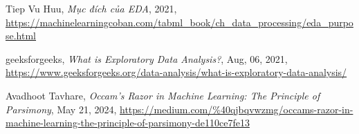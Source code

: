 \begin{thebibliography}{9}

	Tiep Vu Huu,
	\textit{Mục đích của EDA}, 2021,
	\newline
	\url{https://machinelearningcoban.com/tabml_book/ch_data_processing/eda_purpose.html}

	geeksforgeeks,
	\textit{What is Exploratory Data Analysis?}, Aug, 06, 2021,
	\newline
	\url{https://www.geeksforgeeks.org/data-analysis/what-is-exploratory-data-analysis/}

	Avadhoot Tavhare,
	\textit{Occam’s Razor in Machine Learning: The Principle of Parsimony}, May 21, 2024,
	\newline
	\url{https://medium.com/%40qjbqvwzmg/occams-razor-in-machine-learning-the-principle-of-parsimony-de110ce7fe13}

\end{thebibliography}
